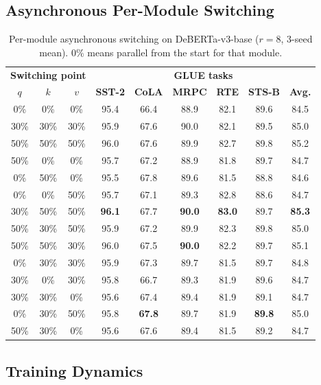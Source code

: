 \documentclass{article}
\begin{document}
\subsection{Asynchronous Per-Module Switching}
\label{app:async}

\begin{table}[!ht]
\caption{Per-module asynchronous switching on DeBERTa-v3-base ($r=8$, 3-seed mean). $0\%$ means parallel from the start for that module.}
\label{tab:t3_async_final}
\centering
\small
\begin{tabular}{ccc|cccccc}
\toprule
\multicolumn{3}{c|}{\textbf{Switching point}} & \multicolumn{6}{c}{\textbf{GLUE tasks}} \\
$q$ & $k$ & $v$ & \textbf{SST-2} & \textbf{CoLA} & \textbf{MRPC} & \textbf{RTE} & \textbf{STS-B} & \textbf{Avg.} \\
\midrule
0\%  & 0\%  & 0\%  & 95.4 & 66.4 & 88.9 & 82.1 & 89.6 & 84.5 \\
30\% & 30\% & 30\% & 95.9 & 67.6 & 90.0 & 82.1 & 89.5 & 85.0 \\
50\% & 50\% & 50\% & 96.0 & 67.6 & 89.9 & 82.7 & 89.8 & 85.2 \\
\midrule
50\% & 0\%  & 0\%  & 95.7 & 67.2 & 88.9 & 81.8 & 89.7 & 84.7 \\
0\%  & 50\% & 0\%  & 95.5 & 67.8 & 89.6 & 81.5 & 88.8 & 84.6 \\
0\%  & 0\%  & 50\% & 95.7 & 67.1 & 89.3 & 82.8 & 88.6 & 84.7 \\
30\% & 50\% & 50\% & \textbf{96.1} & 67.7 & \textbf{90.0} & \textbf{83.0} & 89.7 & \textbf{85.3} \\
50\% & 30\% & 50\% & 95.9 & 67.2 & 89.9 & 82.3 & 89.8 & 85.0 \\
50\% & 50\% & 30\% & 96.0 & 67.5 & \textbf{90.0} & 82.2 & 89.7 & 85.1 \\
\midrule
0\%  & 30\% & 30\% & 95.9 & 67.3 & 89.7 & 81.5 & 89.7 & 84.8 \\
30\% & 0\%  & 30\% & 95.8 & 66.7 & 89.3 & 81.9 & 89.6 & 84.7 \\
30\% & 30\% & 0\%  & 95.6 & 67.4 & 89.4 & 81.9 & 89.1 & 84.7 \\
\midrule
0\%  & 30\% & 50\% & 95.8 & \textbf{67.8} & 89.7 & 81.9 & \textbf{89.8} & 85.0 \\
50\% & 30\% & 0\%  & 95.6 & 67.6 & 89.4 & 81.5 & 89.2 & 84.7 \\
\bottomrule
\end{tabular}
\end{table}

\subsection{Training Dynamics}
\label{app:training_dynamics}
\end{document}
